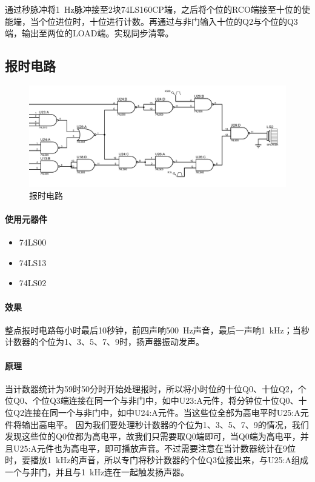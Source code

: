 \documentclass[lang=cn, 11pt, a4paper, cite=authornum, ctexfont]{paper}
\begin{document}
通过秒脉冲将\SI{1}{\hertz}脉冲接至2块74LS160CP端，之后将个位的RCO端接至十位的使能端，当个位进位时，十位进行计数。再通过与非门输入十位的Q2与个位的Q3端，输出至两位的LOAD端。实现同步清零。


\subsection{报时电路}

\begin{figure}[H]
	\begin{center}
		\includegraphics[width=1\textwidth]{pdf/报时电路.PDF}
		\caption{报时电路\label{ifg:speak}}
	\end{center}
\end{figure}

\paragraph{使用元器件}

\begin{itemize}
	\item 74LS00
	\item 74LS13
	\item 74LS02
\end{itemize}

\paragraph{效果}

整点报时电路每小时最后10秒钟，前四声响\SI{500}{\hertz}声音，最后一声响\SI{1}{\kilo\hertz}；当秒计数器的个位为1、3、5、7、9时，扬声器振动发声。

\paragraph{原理}
当计数器统计为59时50分时开始处理报时，所以将小时位的十位Q0、十位Q2，个位Q0、个位Q3端连接在同一个与非门中，如中U23:A元件，将分钟位十位Q0、十位Q2连接在同一个与非门中，如中U24:A元件。当这些位全部为高电平时U25:A元件将输出高电平。
因为我们要处理秒计数器的个位为1、3、5、7、9的情况，我们发现这些位的Q0位都为高电平，故我们只需要取Q0端即可，当Q0端为高电平，并且U25:A元件也为高电平，即可播放声音。不过需要注意在当计数器统计在9位时，要播放\SI{1}{\kilo\hertz}的声音，所以专门将秒计数器的个位Q3位接出来，与U25:A组成一个与非门，并且与\SI{1}{\kilo\hertz}连在一起触发扬声器。
\end{document}
